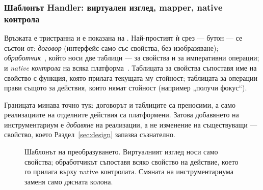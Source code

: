 \subsubsection{Шаблонът Handler: виртуален изглед, mapper, native контрола}
Връзката е тристранна и е показана на . Най-простият ѝ срез ---
бутон --- се състои от: \emph{договор} (интерфейс само със свойства, без изобразяване);
\emph{обработчик}~\cite{maui_handlers}, който носи две таблици --- за свойства и за
императивни операции; и \emph{native контрола} на всяка платформа~\cite{uikit_docs,android_views,winui_docs}.
Таблицата за свойства съпоставя име на свойство с функция, която прилага текущата му
стойност; таблицата за операции прави същото за действия, които нямат стойност (например
„получи фокус“).

Границата минава точно тук: договорът и таблиците са преносими, а само реализациите на
отделните действия са платформени. Затова добавянето на инструментариум е
\emph{добавяне} на реализации, а не изменение на съществуващи --- свойство, което
Раздел~\ref{sec:design} запазва съзнателно.

\begin{figure}[H]
\centering
{}
\caption{Шаблонът на преобразуването. Виртуалният изглед носи само свойства; обработчикът съпоставя всяко свойство на действие, което го прилага върху native контролата.
Смяната на инструментариума заменя само дясната колона.}
\label{fig:handler}
\end{figure}


